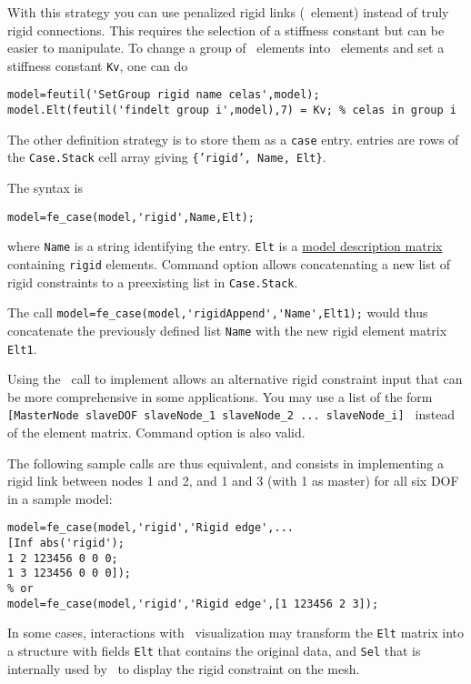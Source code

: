 With this strategy you can use penalized rigid links (\celas\ element) instead of truly rigid connections. This requires the selection of a stiffness constant but can be easier to manipulate. To change a group of \rigid\ elements into \celas\ elements and set a stiffness constant {\tt Kv}, one can do

\begin{verbatim}
model=feutil('SetGroup rigid name celas',model);
model.Elt(feutil('findelt group i',model),7) = Kv; % celas in group i
\end{verbatim}


\vs The other  definition strategy is to store them as a {\tt case} entry.  entries are rows of the {\tt Case.Stack} cell array giving {\tt \{'rigid', Name, Elt\}}. 

The syntax is 
\begin{verbatim}
model=fe_case(model,'rigid',Name,Elt);
\end{verbatim}
where {\tt Name} is a string identifying the entry. {\tt Elt} is a \hyperlink{elt}{model description matrix} containing {\tt rigid} elements. 
Command option  allows concatenating a new list of rigid constraints to a preexisting list in {\tt Case.Stack}. 

The call \verb+model=fe_case(model,'rigidAppend','Name',Elt1);+ would thus concatenate the previously defined list {\tt Name} with the new rigid element matrix {\tt Elt1}.


Using the \fecase\ call to implement  allows an alternative rigid constraint input that can be more comprehensive in some applications. You may use a list of the form {\tt [MasterNode slaveDOF slaveNode\_1 slaveNode\_2 ... slaveNode\_i] } instead of the element matrix. Command option  is also valid.

\vs The following sample calls are thus equivalent, and consists in implementing a rigid link between nodes 1 and 2, and 1 and 3 (with 1 as master) for all six DOF in a sample model:

\begin{verbatim}
model=fe_case(model,'rigid','Rigid edge',...
[Inf abs('rigid'); 
1 2 123456 0 0 0;
1 3 123456 0 0 0]);
% or
model=fe_case(model,'rigid','Rigid edge',[1 123456 2 3]);
\end{verbatim}

\vs In some cases, interactions with \feplot\ visualization may transform the {\tt Elt} matrix into a structure with fields {\tt Elt} that contains the original data, and {\tt Sel} that is internally used by \feplot\ to display the rigid constraint on the mesh.

